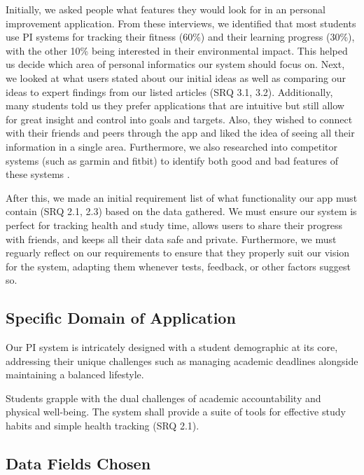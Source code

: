 \documentclass[12pt]{article}
\begin{document}
Initially, we asked people what features they would look for in an personal
improvement application. From these interviews, we identified that most
students use PI systems for tracking their fitness (60\%) and their learning
progress (30\%), with the other 10\% being interested in their environmental
impact. This helped us decide which area of personal informatics our system
should focus on. Next, we looked at what users stated about our initial ideas
as well as comparing our ideas to expert findings from our listed articles (SRQ 3.1, 3.2).
Additionally, many students told us they prefer applications that are intuitive
but still allow for great insight and control into goals and targets. Also,
they wished to connect with their friends and peers through the app and liked
the idea of seeing all their information in a single area. Furthermore, we also
researched into competitor systems (such as garmin and fitbit) to identify both
good and bad features of these systems .\par

After this, we made an initial requirement list of what functionality our app must contain (SRQ 2.1, 2.3)
based on the data gathered. We must ensure our system is perfect for tracking
health and study time, allows users to share their progress with friends, and
keeps all their data safe and private. Furthermore, we must reguarly reflect on our requirements
to ensure that they properly suit our vision for the system, adapting them whenever tests, feedback, or other factors suggest so.
 

\subsection{Specific Domain of Application}

Our PI system is intricately designed with a student demographic at its core,
addressing their unique challenges such as managing academic deadlines
alongside maintaining a balanced lifestyle.\par 

Students grapple with the dual challenges of academic accountability and
physical well-being. The system shall provide a suite of tools for effective
study habits and simple health tracking (SRQ 2.1).
 

\subsection{Data Fields Chosen}
\end{document}
